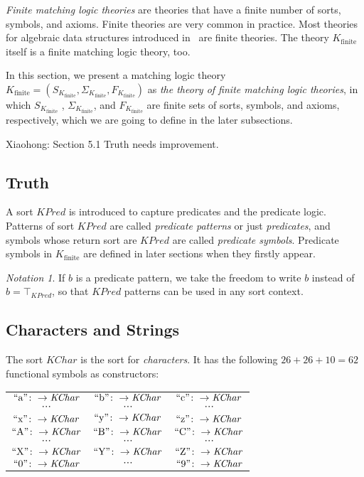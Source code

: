 \documentclass[UTF8,11pt]{article}
\newcounter{thmcounter}
\theoremstyle{plain}
\theoremstyle{definition}
\theoremstyle{remark}
\newtheorem{notation}   [thmcounter]{Notation}
\newcommand{\Kfinite}{{K_\text{finite}}}
\newcommand{\KPred}{\mathit{KPred}}
\newcommand{\KChar}{\mathit{KChar}}
\newcommand{\quot}[1]{\mathrm{``#1"}}
\begin{document}
\emph{Finite matching logic theories} are theories that have a finite number of sorts, symbols, and axioms.
Finite theories are very common in practice.
Most theories for algebraic data structures introduced in~\cite{rosu-2017-lmcs} are finite theories. 
The theory $\Kfinite$ itself is a finite matching logic theory, too.

In this section, we present a matching logic theory $\Kfinite = ( S_\Kfinite, \Sigma_\Kfinite, F_\Kfinite )$ as \emph{the theory of finite matching logic theories}, in which $S_\Kfinite$ , $\Sigma_\Kfinite$, and $F_\Kfinite$ are finite sets of sorts, symbols, and axioms, respectively, which we are going to define in the later subsections.

\improvement
{Xiaohong: Section 5.1 Truth needs improvement.}
\subsection{Truth}

A sort $\KPred$ is introduced to capture predicates and the predicate logic.
Patterns of sort $\KPred$ are called \emph{predicate patterns} or just \emph{predicates}, and symbols whose return sort are $\KPred$ are called \emph{predicate symbols}. 
Predicate symbols in $\Kfinite$ are defined in later sections when they firstly appear.
\begin{notation}
	If $b$ is a predicate pattern, we take the freedom to write $b$ instead of $b = \top_\KPred$, so that $\KPred$ patterns can be used in any sort context.
\end{notation}





\subsection{Characters and Strings}
The sort $\KChar$ is the sort for \emph{characters}. It has the following $26 + 26 + 10 = 62$ functional symbols as constructors:
\begin{center}
	\begin{tabular}{c c c}
		$\quot{a} \colon \to \KChar$ & $\quot{b} \colon \to \KChar$ & $\quot{c} \colon \to \KChar$ \\
		$\cdots$ & $\cdots$ & $\cdots$ \\
		$\quot{x} \colon \to \KChar$ & $\quot{y} \colon \to \KChar$ & $\quot{z} \colon \to \KChar$ \\
		$\quot{A} \colon \to \KChar$ & $\quot{B} \colon \to \KChar$ & $\quot{C} \colon \to \KChar$ \\
		$\cdots$ & $\cdots$ & $\cdots$ \\
		$\quot{X} \colon \to \KChar$ & $\quot{Y} \colon \to \KChar$ & $\quot{Z} \colon \to \KChar$ \\
		$\quot{0} \colon \to \KChar$ & $\cdots$ & $\quot{9} \colon \to \KChar$ 
	\end{tabular}
\end{center}
\end{document}
